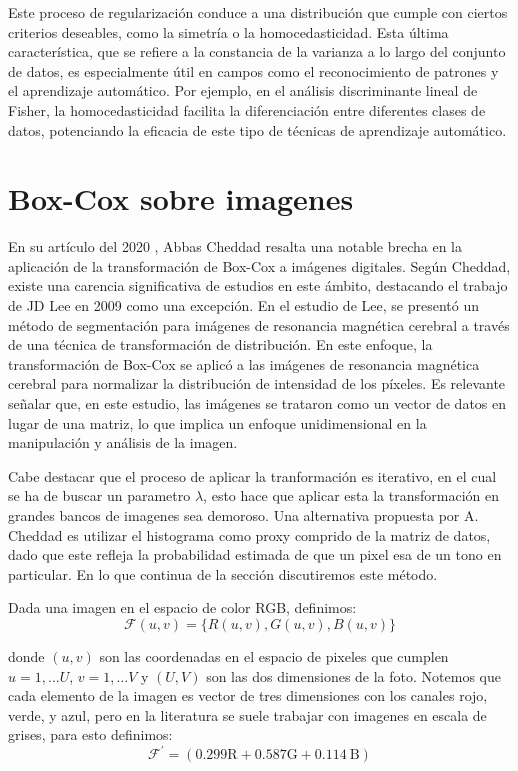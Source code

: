     Este proceso de regularizaci\'on conduce a una distribuci\'on que cumple con ciertos criterios deseables, como la simetr\'ia o la homocedasticidad. Esta \'ultima caracter\'istica, que se refiere a la constancia de la varianza a lo largo del conjunto de datos, es especialmente \'util en campos como el reconocimiento de patrones y el aprendizaje autom\'atico. Por ejemplo, en el an\'alisis discriminante lineal de Fisher, la homocedasticidad facilita la diferenciaci\'on entre diferentes clases de datos, potenciando la eficacia de este tipo de t\'ecnicas de aprendizaje autom\'atico.


    \section[]{Box-Cox sobre imagenes} 

    En su art\'iculo del 2020 \cite{boxcoximg}, Abbas Cheddad resalta una notable brecha en la aplicaci\'on de la transformaci\'on de Box-Cox a im\'agenes digitales. Seg\'un Cheddad, existe una carencia significativa de estudios en este \'ambito, destacando el trabajo de JD Lee en 2009 como una excepci\'on\cite{lee2009mr}. En el estudio de Lee, se present\'o un m\'etodo de segmentaci\'on para im\'agenes de resonancia magn\'etica cerebral a trav\'es de una t\'ecnica de transformaci\'on de distribuci\'on. En este enfoque, la transformaci\'on de Box-Cox se aplic\'o a las im\'agenes de resonancia magn\'etica cerebral para normalizar la distribuci\'on de intensidad de los p\'ixeles. Es relevante se\~nalar que, en este estudio, las im\'agenes se trataron como un vector de datos en lugar de una matriz, lo que implica un enfoque unidimensional en la manipulaci\'on y an\'alisis de la imagen.

    Cabe destacar que el proceso de aplicar la tranformaci\'on es iterativo, en el cual se ha de buscar un parametro $\lambda$, esto hace que aplicar esta la transformaci\'on en grandes bancos de imagenes sea demoroso. Una alternativa propuesta por A. Cheddad \cite{boxcoximg} es utilizar el histograma como proxy comprido de la matriz de datos, dado que este refleja la probabilidad estimada de que un pixel esa de un tono en particular. En lo que continua de la secci\'on discutiremos este m\'etodo.

    Dada una imagen en el espacio de color RGB, definimos:
    $$
    \mathcal{F}(u, v)=\{R(u, v), G(u, v), B(u, v)\}
    $$

    donde $(u, v)$ son las coordenadas en el espacio de pixeles que cumplen $u=1, \ldots U$, $v=1, \ldots V$ y $(U, V)$ son las dos dimensiones de la foto. Notemos que cada elemento de la imagen es vector de tres dimensiones con los canales rojo, verde, y azul, pero en la literatura se suele trabajar con imagenes en escala de grises, para esto definimos:
    $$
    \mathcal{F}^{\prime} =(0.299 \mathrm{R}+0.587 \mathrm{G}+0.114 \mathrm{~B})
    $$

